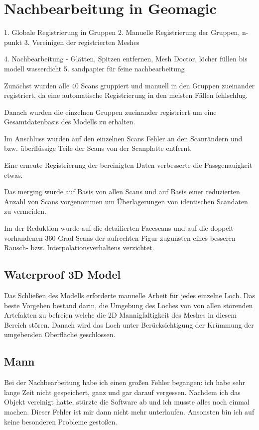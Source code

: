 \documentclass[]{article}
\begin{document}
\section{Nachbearbeitung in Geomagic} %

1. Globale Registrierung in Gruppen
2. Manuelle Registrierung der Gruppen, n-punkt
3. Vereinigen der registrierten Meshes

4. Nachbearbeitung
- Glätten, Spitzen entfernen, Mesh Doctor, löcher füllen
bis modell wasserdicht
5. sandpapier für feine nachbearbeitung


Zunächst wurden alle $40$ Scans gruppiert und manuell in den Gruppen zueinander registriert, da eine automatische Registrierung in den meisten Fällen fehlschlug.

Danach wurden die einzelnen Gruppen zueinander registriert um eine Gesamtdatenbasis des Modells zu erhalten.

Im Anschluss wurden auf den einzelnen Scans Fehler an den Scanrändern und bzw. überflüssige Teile der Scans von der Scanplatte entfernt.

Eine erneute Registrierung der bereinigten Daten verbesserte die Passgenauigkeit etwas. 

Das merging wurde auf Basis von allen Scans und auf Basis einer reduzierten Anzahl von Scans vorgenommen um Überlagerungen von identischen Scandaten zu vermeiden.

Im der Reduktion wurde auf die detailierten Facescans und auf die doppelt vorhandenen 360 Grad Scans der aufrechten Figur zugunsten eines besseren Rausch- bzw. Interpolationsverhaltens verzichtet.

\subsection{Waterproof 3D Model}

Das Schließen des Modells erforderte manuelle Arbeit für jedes einzelne Loch. Das beste Vorgehen bestand darin, die Umgebung des Loches von von allen störenden Artefakten zu befreien welche die 2D Mannigfaltigkeit des Meshes in diesem Bereich stören. Danach wird das Loch unter Berücksichtigung der Krümmung der umgebenden Oberfläche geschlossen.

\subsection{}
\subsection{Mann}
Bei der Nachbearbeitung habe ich einen großen Fehler begangen: ich habe sehr lange Zeit nicht gespeichert, ganz und gar darauf vergessen. Nachdem ich das Objekt vereinigt hatte, stürzte die Software ab und ich musste alles noch einmal machen. Dieser Fehler ist mir dann nicht mehr unterlaufen. Ansonsten bin ich auf keine besonderen Probleme gestoßen.
\end{document}
